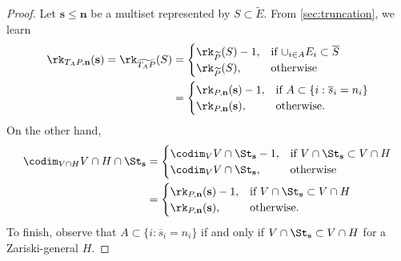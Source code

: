 \begin{proof}
  Let $\mathbf s \leq \mathbf n$ be a multiset represented by $S \subset \widetilde E$.
  From \cref{sec:truncation}, we learn
  \begin{align*}
    \rk_{T_A P, \mathbf n}(\mathbf s) = \rk_{\widetilde{T_A P}}(S)
    &=  \begin{cases} \rk_{\widetilde P}(S) - 1, & \text{if $\cup_{i \in A} E_i \subset \overline S$} \\
      \rk_{\widetilde P}(S), & \text{otherwise}
                               \end{cases}\\
                               &= \begin{cases}
                                 \rk_{P, \mathbf n}(\mathbf s) - 1, & \text{if $A \subset \{i : \overline s_i = n_i\}$} \\
                                 \rk_{P,\mathbf n}(\mathbf s), & \text{otherwise.}
                                 \end{cases}
  \end{align*}
  On the other hand,
  \begin{align*}
    \codim_{V \cap H} V \cap H \cap \St_{\mathbf s}
    &= \begin{cases}
      \codim_V V \cap \St_{\mathbf s} - 1, & \text{if $V \cap \St_{\mathbf s} \subset V \cap H$} \\
      \codim_V V \cap \St_{\mathbf s}, & \text{otherwise}
    \end{cases}\\
    &= \begin{cases}
      \rk_{P, \mathbf n}(\mathbf s) - 1, & \text{if $V \cap \St_{\mathbf s} \subset V \cap H$} \\
      \rk_{P, \mathbf n}(\mathbf s), & \text{otherwise.}
     \end{cases}                                  
   \end{align*}
   To finish, observe that $A \subset \{i : \overline s_i = n_i\}$ if and only if  $V \cap \St_{\mathbf s} \subset V \cap H$ for a Zariski-general $H$.
\end{proof}



